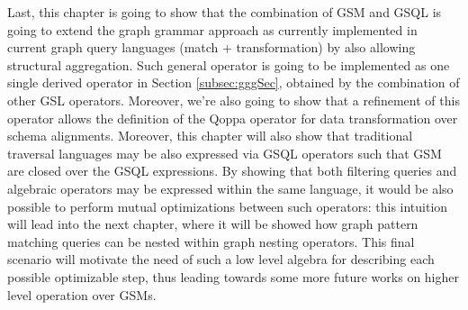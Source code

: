 
Last, this chapter is going to show that the combination of GSM and GSQL is going to extend the graph grammar approach as currently implemented in current graph query languages (match + transformation) by also allowing structural aggregation. Such general operator is going to be implemented as one single derived operator in Section \ref{subsec:gggSec}, obtained by the combination of other GSL operators. Moreover, we're also going to show that a refinement of this operator allows the definition of the Qoppa operator for data transformation over schema alignments.
Moreover, this chapter will also show that traditional traversal languages may be also  expressed via GSQL operators such that GSM are closed over the GSQL expressions. By showing that both filtering queries and algebraic operators may be expressed within the same language, it would be also possible to perform mutual optimizations between such operators: this intuition will lead into the next chapter, where it will be showed how graph pattern matching queries can be nested within graph nesting operators. This final scenario will motivate the need of such a low level algebra for describing each possible optimizable step, thus leading towards some more future works on higher level operation over GSMs.


